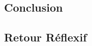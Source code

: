 \documentclass{article}
\begin{document}
\subsection{Conclusion}

\subsection{Retour Réflexif}





\end{document}
